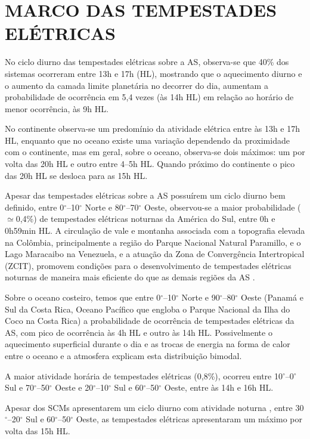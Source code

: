 \section{MARCO DAS TEMPESTADES ELÉTRICAS}

No ciclo diurno das tempestades elétricas sobre a AS, observa-se que 40\% dos sistemas ocorreram entre 13h e 17h (HL), mostrando que o aquecimento diurno e o aumento da camada limite planetária no decorrer do dia, aumentam a probabilidade de ocorrência em 5,4 vezes (às 14h HL) em relação ao horário de menor ocorrência, às 9h HL.

No continente observa-se um predomínio da atividade elétrica entre às 13h e 17h HL, enquanto que no oceano existe uma variação dependendo da proximidade com o continente, mas em geral, sobre o oceano, observa-se dois máximos: um por volta das 20h HL e outro entre 4--5h HL. Quando próximo do continente o pico das 20h HL se desloca para as 15h HL.  

Apesar das tempestades elétricas sobre a AS possuírem um ciclo diurno bem definido, entre 0$^{\circ}$--10$^{\circ}$ Norte e 80$^{\circ}$--70$^{\circ}$ Oeste, observou-se a maior probabilidade ($\simeq$0,4\%) de tempestades elétricas noturnas da América do Sul, entre 0h e 0h59min HL. A circulação de vale e montanha associada com a topografia elevada na Colômbia, principalmente a região do Parque Nacional Natural Paramillo, e o Lago Maracaibo na Venezuela, e a atuação da Zona de Convergência Intertropical (ZCIT), promovem condições para o desenvolvimento de tempestades elétricas noturnas de maneira mais eficiente do que as demais regiões da AS \cite{burgesser2012}.

Sobre o oceano costeiro, temos que entre 0$^{\circ}$--10$^{\circ}$ Norte e 90$^{\circ}$--80$^{\circ}$ Oeste (Panamá e Sul da Costa Rica,  Oceano Pacífico que engloba o Parque Nacional da Ilha do Coco na Costa Rica) a  probabilidade de ocorrência de tempestades elétricas da AS, com pico de ocorrência às 4h HL e outro às 14h HL. Possivelmente o aquecimento superficial durante o dia e as trocas de energia na forma de calor entre o oceano e a atmosfera explicam esta distribuição bimodal.

A maior atividade horária de tempestades elétricas (0,8\%), ocorreu entre 10$^{\circ}$--0$^{\circ}$ Sul e 70$^{\circ}$--50$^{\circ}$ Oeste e 20$^{\circ}$--10$^{\circ}$ Sul e 60$^{\circ}$--50$^{\circ}$ Oeste, entre às 14h e 16h HL.

Apesar dos SCMs apresentarem um ciclo diurno com atividade noturna \cite{Velasco1987, Durkee2009, machado1998}, entre 30$^{\circ}$--20$^{\circ}$ Sul e 60$^{\circ}$--50$^{\circ}$ Oeste, as tempestades elétricas apresentaram um máximo por volta das 15h HL.


